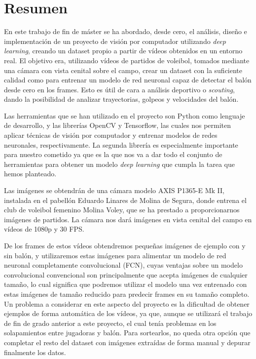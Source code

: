 \section*{Resumen}

En este trabajo de fin de máster se ha abordado, desde cero, el análisis, diseño e implementación de un proyecto de visión por computador utilizando \textit{deep learning}, creando un dataset propio a partir de vídeos obtenidos en un entorno real. El objetivo era, utilizando vídeos de partidos de voleibol, tomados mediante una cámara con vista cenital sobre el campo, crear un dataset con la suficiente calidad como para entrenar un modelo de red neuronal capaz de detectar el balón desde cero en los frames. Esto es útil de cara a análisis deportivo o \textit{scouting}, dando la posibilidad de analizar trayectorias, golpeos y velocidades del balón.

Las herramientas que se han utilizado en el proyecto son Python como lenguaje de desarrollo, y las librerías OpenCV y Tensorflow, las cuales nos permiten aplicar técnicas de visión por computador y entrenar modelos de redes neuronales, respectivamente. La segunda librería es especialmente importante para nuestro cometido ya que es la que nos va a dar todo el conjunto de herramientas para obtener un modelo \textit{deep learning} que cumpla la tarea que hemos planteado.

Las imágenes se obtendrán de una cámara modelo AXIS P1365-E Mk II, instalada en el pabellón Eduardo Linares de Molina de Segura, donde entrena el club de voleibol femenino Molina Voley, que se ha prestado a proporcionarnos imágenes de partidos. La cámara nos dará imágenes en vista cenital del campo en vídeos de 1080p y 30 FPS.

De los frames de estos vídeos obtendremos pequeñas imágenes de ejemplo con y sin balón, y utilizaremos estas imágenes para alimentar un modelo de red neuronal completamente convolucional (FCN), cuyas ventajas sobre un modelo convolucional convencional son principalmente que acepta imágenes de cualquier tamaño, lo cual significa que podremos utilizar el modelo una vez entrenado con estas imágenes de tamaño reducido para predecir frames en su tamaño completo. Un problema a considerar en este aspecto del proyecto es la dificultad de obtener ejemplos de forma automática de los vídeos, ya que, aunque se utilizará el trabajo de fin de grado anterior a este proyecto, el cual tenía problemas en los solapamientos entre jugadoras y balón. Para sortearlos, no queda otra opción que completar el resto del dataset con imágenes extraídas de forma manual y depurar finalmente los datos.

